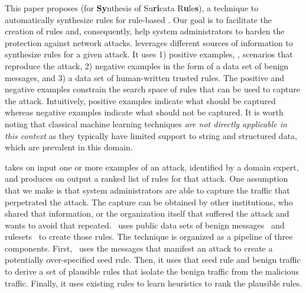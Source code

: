 \documentclass[conference]{IEEEtran}
\begin{document}

\sloppy This paper proposes \tname{} (for \textbf{Sy}nthesis of
Su\textbf{ri}cata R\textbf{u}le\textbf{s}), a technique to
automatically synthesize rules for rule-based \nids. Our goal is to
facilitate the creation of rules and, consequently, help system
administrators to harden the protection against network attacks.
\tname{} leverages different sources of information to synthesize
rules for a given attack. It uses 1) positive examples, \ie{},
scenarios that reproduce the attack, 2) negative examples in the form
of a data set of benign messages, and 3) a data set of human-written
trusted rules. The positive and negative examples constrain the search
space of rules that can be used to capture the attack. Intuitively,
positive examples indicate what should be captured whereas negative
examples indicate what should not be captured. It is worth noting that
classical machine learning techniques \emph{are not directly
  applicable in this context} as they typically have limited support
to string and structured data, which are prevalent in this domain.




\tname{} takes on input one or more examples of an attack, identified by a domain expert, and produces
on output a ranked list of rules for that attack. One assumption that
we make is that system administrators are able to capture the traffic
that perpetrated the attack. The capture can be obtained by other
institutions, who shared that information, or the organization itself
that suffered the attack and wants to avoid that
repeated. \tname\ uses public data sets of benign
messages~\cite{tcpreplay,stratosphere-normal} and
rulesets~\cite{emerging-threats-open} to create those rules. The
technique is organized as a pipeline of three components. First,
\tname\ uses the messages that manifest an attack to create a
potentially over-specified seed rule. Then, it uses that seed rule and
benign traffic to derive a set of plausible rules that isolate the
benign traffic from the malicious traffic. Finally, it uses existing
rules to learn heuristics to rank the plausible rules.
\end{document}
